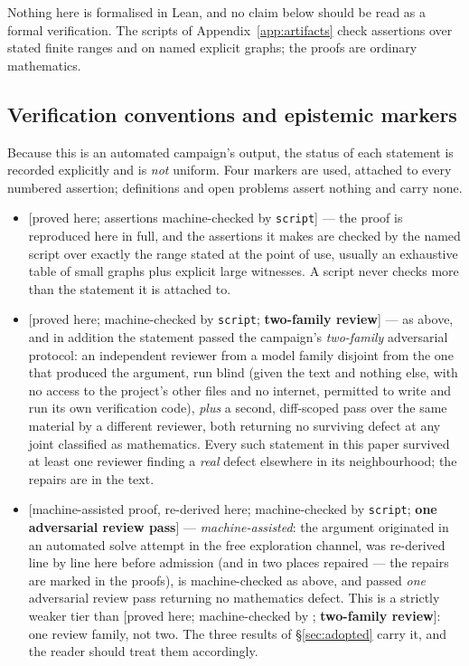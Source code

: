 \documentclass[11pt]{article}
\theoremstyle{plain}
\theoremstyle{definition}
\theoremstyle{remark}
\numberwithin{equation}{section}
\newcommand{\statusbox}[1]{{\small\sloppy\textsf{[#1]}}}
\newcommand{\PRV}[1]{\statusbox{proved here; assertions machine-checked by \texttt{#1}}}
\newcommand{\REV}[1]{\statusbox{proved here; machine-checked by \texttt{#1};
\textbf{two-family review}}}
\newcommand{\AD}[1]{\statusbox{machine-assisted proof, re-derived here;
machine-checked by \texttt{#1}; \textbf{one adversarial review pass}}}
\begin{document}
Nothing here is formalised in Lean, and no claim below should be read as a formal
verification. The scripts of Appendix~\ref{app:artifacts} check assertions over stated finite
ranges and on named explicit graphs; the proofs are ordinary mathematics.

\subsection{Verification conventions and epistemic markers}\label{sec:conventions}

Because this is an automated campaign's output, the status of each statement is recorded
explicitly and is \emph{not} uniform. Four markers are used, attached to every numbered
assertion; definitions and open problems assert nothing and carry none.

\begin{itemize}
\item \PRV{script} --- the proof is reproduced here in full, and the assertions it makes are
checked by the named script over exactly the range stated at the point of use, usually an
exhaustive table of small graphs plus explicit large witnesses. A script never checks more
than the statement it is attached to.

\item \REV{script} --- as above, and in addition the statement passed the campaign's
\emph{two-family} adversarial protocol: an independent reviewer from a model family disjoint
from the one that produced the argument, run blind (given the text and nothing else, with no
access to the project's other files and no internet, permitted to write and run its own
verification code), \emph{plus} a second, diff-scoped pass over the same material by a
different reviewer, both returning no surviving defect at any joint classified as
mathematics. Every such statement in this paper survived at least one reviewer finding a
\emph{real} defect elsewhere in its neighbourhood; the repairs are in the text.

\item \AD{script} --- \emph{machine-assisted}: the argument originated in an automated solve
attempt in the free exploration channel, was re-derived line by line here before admission
(and in two places repaired --- the repairs are marked in the proofs), is machine-checked as
above, and passed \emph{one} adversarial review pass returning no mathematics defect. This is
a strictly weaker tier than \REV{}: one review family, not two. The three results of
\S\ref{sec:adopted} carry it, and the reader should treat them accordingly.


\end{itemize}
\end{document}

